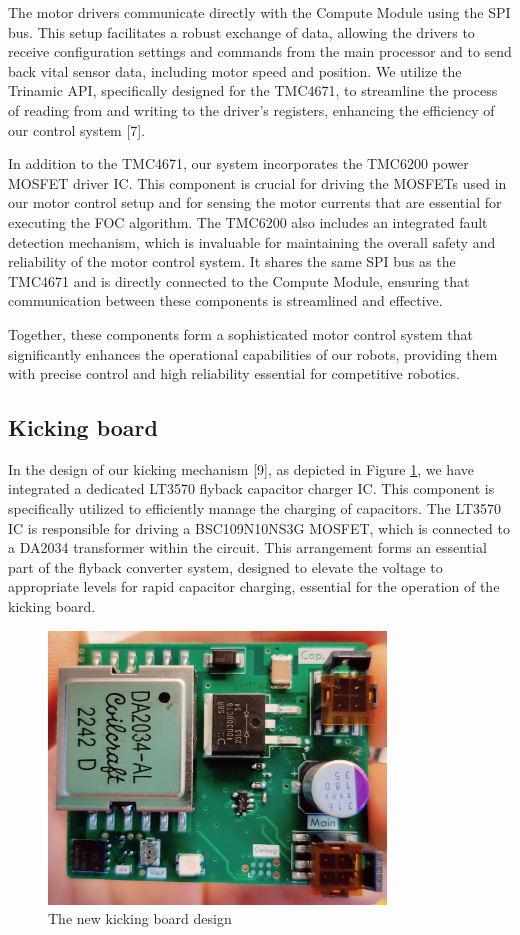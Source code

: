 \documentclass[runningheads]{llncs}
\begin{document}
The motor drivers communicate directly with the Compute Module using the SPI bus. This setup facilitates a robust exchange of data, allowing the drivers to receive configuration settings and commands from the main processor and to send back vital sensor data, including motor speed and position. We utilize the Trinamic API, specifically designed for the TMC4671, to streamline the process of reading from and writing to the driver's registers, enhancing the efficiency of our control system [7].

In addition to the TMC4671, our system incorporates the TMC6200 power MOSFET driver IC. This component is crucial for driving the MOSFETs used in our motor control setup and for sensing the motor currents that are essential for executing the FOC algorithm. The TMC6200 also includes an integrated fault detection mechanism, which is invaluable for maintaining the overall safety and reliability of the motor control system. It shares the same SPI bus as the TMC4671 and is directly connected to the Compute Module, ensuring that communication between these components is streamlined and effective.

Together, these components form a sophisticated motor control system that significantly enhances the operational capabilities of our robots, providing them with precise control and high reliability essential for competitive robotics.
\subsection{Kicking board}
In the design of our kicking mechanism [9], as depicted in Figure \ref{fig:mikona}, we have integrated a dedicated LT3570 flyback capacitor charger IC. This component is specifically utilized to efficiently manage the charging of capacitors. The LT3570 IC is responsible for driving a BSC109N10NS3G MOSFET, which is connected to a DA2034 transformer within the circuit. This arrangement forms an essential part of the flyback converter system, designed to elevate the voltage to appropriate levels for rapid capacitor charging, essential for the operation of the kicking board.
\begin{figure}
    \centering
    \includegraphics[width=0.8\textwidth]{images/mikona.jpg}
    \caption{The new kicking board design}
    \label{fig:mikona}
\end{figure}
\end{document}
